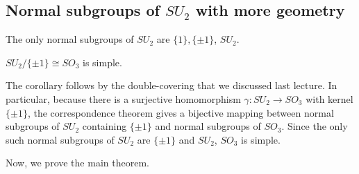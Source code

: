 \subsection{Normal subgroups of $SU_2$ with more geometry}

\begin{theorem}
\thmlabel

The only normal subgroups of $SU_2$ are $\{1\}, \{\pm 1\}$, $SU_2$. 
\end{theorem}

\begin{theorem}
\corlabel

$SU_2/\{\pm 1\} \cong SO_3$ is simple. 
\end{theorem}

The corollary follows by the double-covering that we discussed last lecture. In particular, because there is a surjective homomorphism $\gamma : SU_2\rightarrow SO_3$ with kernel $\{\pm 1\}$, the correspondence theorem gives a bijective mapping between normal subgroups of $SU_2$ containing $\{\pm 1\}$ and normal subgroups of $SO_3$. Since the only such normal subgroups of $SU_2$ are $\{\pm 1\}$ and $SU_2$, $SO_3$ is simple. 

Now, we prove the main theorem.  

